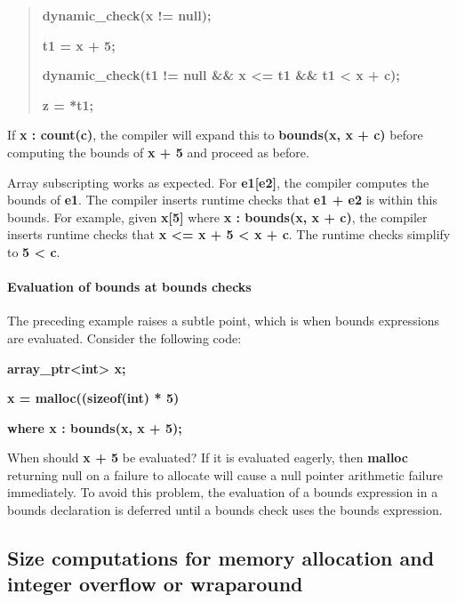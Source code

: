 \documentclass[]{article}
\let\oldparagraph\paragraph
\renewcommand{\paragraph}[1]{\oldparagraph{#1}\mbox{}}
\begin{document}
\begin{quote}
\textbf{dynamic\_check(x != null);}

\textbf{t1 = x + 5;}

\textbf{dynamic\_check(t1 != null \&\& x \textless{}= t1 \&\& t1
\textless{} x + c);}

\textbf{z = *t1;}
\end{quote}

If \textbf{x : count(c)}, the compiler will expand this to
\textbf{bounds(x, x + c)} before computing the bounds of \textbf{x + 5}
and proceed as before.

Array subscripting works as expected. For \textbf{e1{[}e2{]}}, the
compiler computes the bounds of \textbf{e1}. The compiler inserts
runtime checks that \textbf{e1 + e2} is within this bounds. For example,
given \textbf{x{[}5{]}} where \textbf{x : bounds(x, x + c)}, the
compiler inserts runtime checks that \textbf{x \textless{}= x + 5
\textless{} x + c}. The runtime checks simplify to \textbf{5 \textless{}
c}.

\paragraph{\texorpdfstring{\protect\hypertarget{ux5fToc420589185}{}{\protect\hypertarget{ux5fToc422906976}{}{\protect\hypertarget{ux5fToc424307700}{}{}}}Evaluation
of bounds at bounds
checks}{Evaluation of bounds at bounds checks}}\label{evaluation-of-bounds-at-bounds-checks}

The preceding example raises a subtle point, which is when bounds
expressions are evaluated. Consider the following code:

\textbf{array\_ptr\textless{}int\textgreater{} x;}

\textbf{x = malloc((sizeof(int) * 5)}

\textbf{where x : bounds(x, x + 5);}

When should \textbf{x + 5} be evaluated? If it is evaluated eagerly,
then \textbf{malloc} returning null on a failure to allocate will cause
a null pointer arithmetic failure immediately. To avoid this problem,
the evaluation of a bounds expression in a bounds declaration is
deferred until a bounds check uses the bounds expression.

\subsection{\texorpdfstring{\protect\hypertarget{ux5fRef440026168}{}{\protect\hypertarget{ux5fToc440445450}{}{\protect\hypertarget{ux5fToc440449232}{}{\protect\hypertarget{ux5fToc440551882}{}{}}}}Size
computations for memory allocation and integer overflow or
wraparound}{Size computations for memory allocation and integer overflow or wraparound}}\label{size-computations-for-memory-allocation-and-integer-overflow-or-wraparound}
\end{document}
